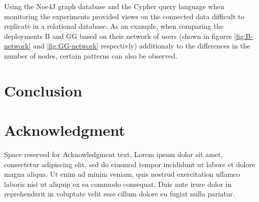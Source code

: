 \documentclass[conference]{IEEEtran}
\begin{document}
Using the Noe4J graph database and the Cypher query language when monitoring the experiments provided 
views on the connected data difficult to replicate in a relational database. As an example, when comparing the
deployments B and GG based on their network of users (shown in figures \ref{fig:B-network} and \ref{fig:GG-network}
respectivly) additionaly to the differences in the number of nodes, certain patterns can also be observed.

\section{Conclusion}
\label{sec:conclusions}


\section*{Acknowledgment}
Space reserved for Acknowledgment text, Lorem ipsum dolor sit amet, consectetur adipiscing elit,
sed do eiusmod tempor incididunt ut labore et dolore magna aliqua. Ut enim ad minim veniam, quis 
nostrud exercitation ullamco laboris nisi ut aliquip ex ea commodo consequat. Duis aute irure dolor
in reprehenderit in voluptate velit esse cillum dolore eu fugiat nulla pariatur. 







%
%
%


\end{document}
